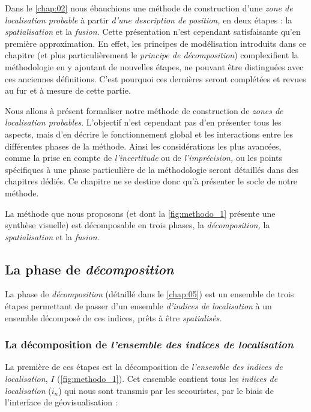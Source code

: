 Dans le \autoref{chap:02} nous ébauchions une méthode de construction
d'une \emph{zone de localisation probable} à partir \emph{d'une
  description de position,} en deux étapes : la \emph{spatialisation}
et la \emph{fusion.} Cette présentation n'est cependant satisfaisante
qu'en première approximation. En effet, les principes de modélisation
introduits dans ce chapitre (et plus particulièrement le
\emph{principe de décomposition}) complexifient la méthodologie en y
ajoutant de nouvelles étapes, ne pouvant être distinguées avec ces
anciennes définitions. C'est pourquoi ces dernières seront complétées
et revues au fur et à mesure de cette partie.

Nous allons à présent formaliser notre méthode de construction de
\emph{zones de localisation probables}. L'objectif n'est cependant pas
d'en présenter tous les aspects, mais d'en décrire le fonctionnement
global et les interactions entre les différentes phases de la
méthode. Ainsi les considérations les plus avancées, comme la prise en
compte de \emph{l'incertitude} ou de \emph{l'imprécision,} ou les
points spécifiques à une phase particulière de la méthodologie seront
détaillés dans des chapitres dédiés. Ce chapitre ne se destine donc qu'à
présenter le socle de notre méthode.

La méthode que nous proposons (et dont la \autoref{fig:methodo_1}
présente une synthèse visuelle) est décomposable en trois phases, la
\emph{décomposition,} la \emph{spatialisation} et la \emph{fusion.}


\subsection{La phase de \emph{décomposition}}

La phase de \emph{décomposition} (détaillé dans le \autoref{chap:05})
est un ensemble de trois étapes permettant de passer d'un ensemble
\emph{d'indices de localisation} à un ensemble décomposé de ces
indices, prêts à être \emph{spatialisés.}

\subsubsection{La décomposition de \emph{l'ensemble des indices de
    localisation}}

La première de ces étapes est la décomposition de \emph{l'ensemble des
  indices de localisation}, \(I\) (\autoref{fig:methodo_1}). Cet
ensemble contient tous les \emph{indices de localisation} (\(i_n\))
qui nous sont transmis par les secouristes, par le biais de
l'interface de géovisualisation :

